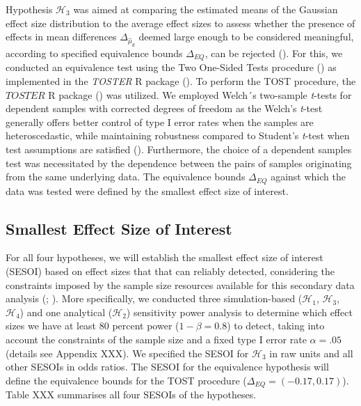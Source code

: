 \documentclass[
  12pt,
]{scrartcl}
\begin{document}
Hypothesis \(\mathcal{H}_3\) was aimed at comparing the estimated means
of the Gaussian effect size distribution to the average effect sizes to
assess whether the presence of effects in mean differences
\(\Delta_{\widehat{\mu}_d}\) deemed large enough to be considered
meaningful, according to specified equivalence bounds \(\Delta_{EQ}\),
can be rejected (). For this, we conducted an equivalence test using the Two
One-Sided Tests procedure
() as
implemented in the \emph{TOSTER} R package
(). To
perform the TOST procedure, the \(TOSTER\) R package
() was
utilized. We employed Welch´s two-sample \emph{t}-tests for dependent
samples with corrected degrees of freedom as the Welch's \emph{t}-test
generally offers better control of type I error rates when the samples
are heteroscedastic, while maintaining robustness compared to Student's
\emph{t}-test when test assumptions are satisfied
(). Furthermore,
the choice of a dependent samples test was necessitated by the
dependence between the pairs of samples originating from the same
underlying data. The equivalence bounds \(\Delta_{EQ}\) against which
the data was tested were defined by the smallest effect size of
interest.

\subsection{Smallest Effect Size of
Interest}\label{smallest-effect-size-of-interest}

For all four hypotheses, we will establish the smallest effect size of
interest (SESOI) based on effect sizes that that can reliably detected,
considering the constraints imposed by the sample size resources
available for this secondary data analysis
(;
). More
specifically, we conducted three simulation-based (\(\mathcal{H}_1\),
\(\mathcal{H}_3\), \(\mathcal{H}_4\)) and one analytical
(\(\mathcal{H}_2\)) sensitivity power analysis to determine which effect
sizes we have at least 80 percent power (\(1-\beta=0.8\)) to detect,
taking into account the constraints of the sample size and a fixed type
I error rate \(\alpha = .05\) (details see Appendix XXX). We specified
the SESOI for \(\mathcal{H}_3\) in raw units and all other SESOIs in
odds ratios. The SESOI for the equivalence hypothesis will define the
equivalence bounds for the TOST procedure
(\(\Delta_{EQ} = (-0.17, 0.17)\)). Table XXX summarises all four SESOIs
of the hypotheses.
\end{document}

